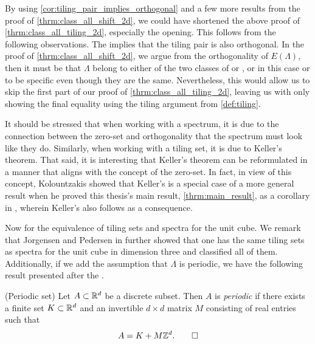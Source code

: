 \documentclass[../thesis.tex]{subfiles}
\begin{document}
\begin{remark}
    By using \cref{cor:tiling_pair_implies_orthogonal} and a few more results from the proof of \cref{thrm:class_all_shift_2d}, we could have shortened the above proof of \cref{thrm:class_all_tiling_2d}, especially the opening. This follows from the following observations. The  implies that the tiling pair is also orthogonal. In the proof of \cref{thrm:class_all_shift_2d}, we argue from the orthogonality of $E(\Lambda)$, then it must be that $\Lambda$ belong to either of the two classes of  or , or in this case  or  to be specific even though they are the same. Nevertheless, this would allow us to skip the first part of our proof of \cref{thrm:class_all_tiling_2d}, leaving us with only showing the final equality using the tiling argument from \cref{def:tiling}.
\end{remark}

It should be stressed that when working with a spectrum, it is due to the connection between the zero-set and orthogonality that the spectrum must look like they do. Similarly, when working with a tiling set, it is due to Keller's theorem. That said, it is interesting that Keller's theorem can be reformulated in a manner that aligns with the concept of the zero-set. In fact, in view of this concept, Kolountzakis showed that Keller's  is a special case of a more general result when he proved this thesis's main result, \cref{thrm:main_result}, as a corollary in \cite{kolountzakisPackingTilingOrthogonality2000}, wherein Keller's  also follows as a consequence.

Now for the equivalence of tiling sets and spectra for the unit cube. We remark that Jorgensen and Pedersen in \cite{jorgensenSpectralPairsCartesian2001} further showed that one has the same tiling sets as spectra for the unit cube in dimension three and classified all of them. Additionally, if we add the assumption that $\Lambda$ is periodic, we have the following result presented after the .
\begin{definition}(Periodic set)\label{def:periodic_set}
    Let $A\subset\mathbb{R}^d$ be a discrete subset. Then $A$ is \emph{periodic} if there exists a finite set $K\subset\mathbb{R}^d$ and an invertible $d\times d$ matrix $M$ consisting of real entries such that 
    \begin{equation*}
        A = K + M\mathbb{Z}^d. \qedhere
    \end{equation*}
\end{definition}
\end{document}

